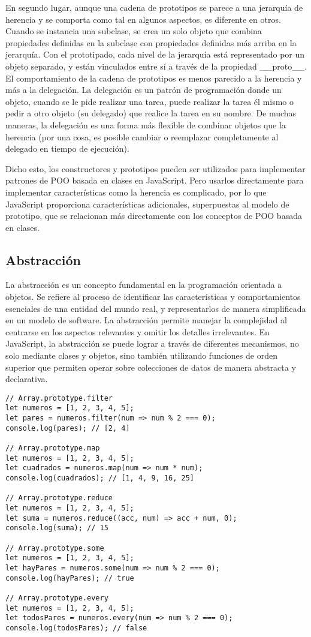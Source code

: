 \documentclass{article}
\begin{document}
En segundo lugar, aunque una cadena de prototipos se parece a una jerarquía 
de herencia y se comporta como tal en algunos aspectos, es diferente en 
otros. Cuando se instancia una subclase, se crea un solo objeto que combina 
propiedades definidas en la subclase con propiedades definidas más arriba 
en la jerarquía. Con el prototipado, cada nivel de la jerarquía está 
representado por un objeto separado, y están vinculados entre sí a través 
de la propiedad \_\_proto\_\_. El comportamiento de la cadena de prototipos 
es menos parecido a la herencia y más a la delegación. La delegación es un 
patrón de programación donde un objeto, cuando se le pide realizar una 
tarea, puede realizar la tarea él mismo o pedir a otro objeto (su delegado) 
que realice la tarea en su nombre. De muchas maneras, la delegación es una 
forma más flexible de combinar objetos que la herencia 
(por una cosa, es posible cambiar o reemplazar completamente al delegado en 
tiempo de ejecución).

Dicho esto, los constructores y prototipos pueden ser utilizados para 
implementar patrones de POO basada en clases en JavaScript. Pero usarlos 
directamente para implementar características como la herencia es complicado, 
por lo que JavaScript proporciona características adicionales, superpuestas 
al modelo de prototipo, que se relacionan más directamente con los conceptos 
de POO basada en clases.

\subsection{Abstracción}

La abstracción es un concepto fundamental en la programación orientada a 
objetos. Se refiere al proceso de identificar las características y 
comportamientos esenciales de una entidad del mundo real, y representarlos 
de manera simplificada en un modelo de software. La abstracción permite 
manejar la complejidad al centrarse en los aspectos relevantes y omitir los 
detalles irrelevantes. En JavaScript, la abstracción se puede lograr a 
través de diferentes mecanismos, no solo mediante clases y objetos, sino 
también utilizando funciones de orden superior que permiten operar sobre 
colecciones de datos de manera abstracta y declarativa.

\begin{lstlisting}
// Array.prototype.filter
let numeros = [1, 2, 3, 4, 5];
let pares = numeros.filter(num => num % 2 === 0);
console.log(pares); // [2, 4]

// Array.prototype.map
let numeros = [1, 2, 3, 4, 5];
let cuadrados = numeros.map(num => num * num);
console.log(cuadrados); // [1, 4, 9, 16, 25]

// Array.prototype.reduce
let numeros = [1, 2, 3, 4, 5];
let suma = numeros.reduce((acc, num) => acc + num, 0);
console.log(suma); // 15

// Array.prototype.some
let numeros = [1, 2, 3, 4, 5];
let hayPares = numeros.some(num => num % 2 === 0);
console.log(hayPares); // true

// Array.prototype.every
let numeros = [1, 2, 3, 4, 5];
let todosPares = numeros.every(num => num % 2 === 0);
console.log(todosPares); // false
\end{lstlisting}
\end{document}
